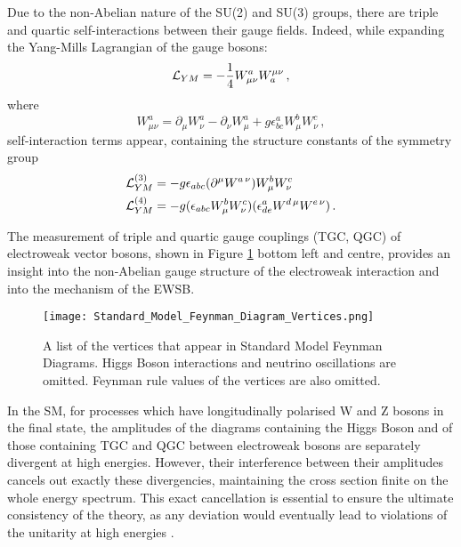 Due to the non-Abelian nature of the SU(2) and SU(3) groups, there are triple and quartic self-interactions between their gauge fields.
Indeed, while expanding the Yang-Mills Lagrangian of the gauge bosons:
\begin{equation}
\mathcal{L}_{YM} = -\frac{1}{4} W^a_{\mu\nu} W_a^{\mu\nu}\,,
\end{equation}
where
\begin{equation}
W^a_{\mu\nu} = \partial_\mu W^a_\nu - \partial_\nu W^a_\mu + g \epsilon^a_{b c} W^b_\mu W^c_\nu\,,
\end{equation}
self-interaction terms appear, containing the structure constants of the symmetry group
\begin{equation}
  \begin{split}
    \mathcal{L}_{YM}^{(3)} &= -g \epsilon_{a b c} (\partial^\mu W^{a \, \nu}) W^b_\mu W^c_\nu
    \\
    \mathcal{L}_{YM}^{(4)} &= -g (\epsilon_{a b c} W^b_\mu W^c_\nu) (\epsilon^a_{d e} W^{d\,\mu} W^{e\,\nu})\,.
  \end{split}
\end{equation}

The measurement of triple and quartic gauge couplings (TGC, QGC) of electroweak vector bosons, shown in Figure \ref{fig:SMvertices} bottom left and centre, provides an insight into the non-Abelian gauge structure of the electroweak interaction and into the mechanism of the EWSB.
%
\begin{figure}
	\centering
	\texttt{[image: Standard\_Model\_Feynman\_Diagram\_Vertices.png]}
	\caption{A list of the vertices that appear in Standard Model Feynman Diagrams. Higgs Boson interactions and neutrino oscillations are omitted. Feynman rule values of the vertices are also omitted. \cite{wikipedia_SM_feynman_vertices}}
        \label{fig:SMvertices}
\end{figure}

In the SM, for processes which have longitudinally polarised W and Z bosons in the final state,
the amplitudes of the diagrams containing the Higgs Boson and of those containing TGC and QGC between electroweak bosons are separately divergent at high energies.
However, their interference between their amplitudes cancels out exactly these divergencies, maintaining the cross section finite on the whole energy spectrum.
This exact cancellation is essential to ensure the ultimate consistency of the theory, as any deviation would eventually lead to violations of the unitarity at high energies \cite{PhysRevLett.38.883}.

